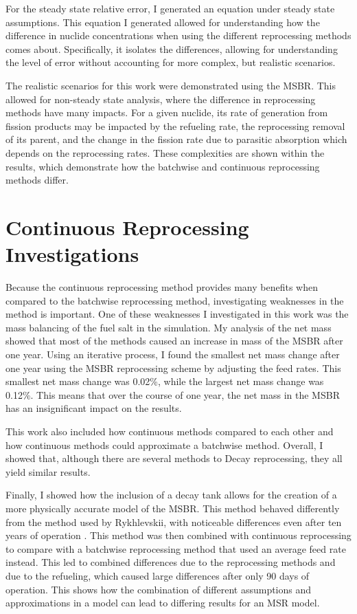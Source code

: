 For the steady state relative error, I generated an equation under steady state assumptions.
This equation I generated allowed for understanding how the difference in nuclide concentrations when using the different reprocessing methods comes about.
Specifically, it isolates the differences, allowing for understanding the level of error without accounting for more complex, but realistic scenarios.

The realistic scenarios for this work were demonstrated using the MSBR.
This allowed for non-steady state analysis, where the difference in reprocessing methods have many impacts.
For a given nuclide, its rate of generation from fission products may be impacted by the refueling rate, the reprocessing removal of its parent, and the change in the fission rate due to parasitic absorption which depends on the reprocessing rates.
These complexities are shown within the results, which demonstrate how the batchwise and continuous reprocessing methods differ.

\section{Continuous Reprocessing Investigations}

Because the continuous reprocessing method provides many benefits when compared to the batchwise reprocessing method, investigating weaknesses in the method is important.
One of these weaknesses I investigated in this work was the mass balancing of the fuel salt in the simulation.
My analysis of the net mass showed that most of the methods caused an increase in mass of the MSBR after one year.
Using an iterative process, I found the smallest net mass change after one year using the MSBR reprocessing scheme by adjusting the feed rates.
This smallest net mass change was 0.02\%, while the largest net mass change was 0.12\%.
This means that over the course of one year, the net mass in the MSBR has an insignificant impact on the results.

This work also included how continuous methods compared to each other and how continuous methods could approximate a batchwise method.
Overall, I showed that, although there are several methods to Decay reprocessing, they all yield similar results.

Finally, I showed how the inclusion of a decay tank allows for the creation of a more physically accurate model of the MSBR.
This method behaved differently from the method used by Rykhlevskii, with noticeable differences even after ten years of operation \cite{rykhlevskii_advanced_2018}.
This method was then combined with continuous reprocessing to compare with a batchwise reprocessing method that used an average feed rate instead.
This led to combined differences due to the reprocessing methods and due to the refueling, which caused large differences after only 90 days of operation.
This shows how the combination of different assumptions and approximations in a model can lead to differing results for an MSR model.


